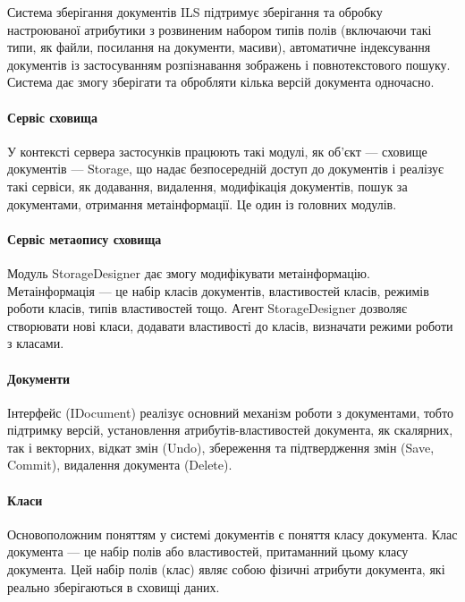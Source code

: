 \documentclass{memoir}
\begin{document}
Система зберігання документів ILS підтримує зберігання та обробку настроюваної атрибутики з розвиненим набором типів полів (включаючи такі типи, як файли, посилання на документи, масиви), автоматичне індексування документів із застосуванням розпізнавання зображень і повнотекстового пошуку. Система дає змогу зберігати та обробляти кілька версій документа одночасно.

\paragraph{Сервіс сховища}

У контексті сервера застосунків працюють такі модулі, як об’єкт — сховище документів — Storage, що надає безпосередній доступ до документів і реалізує такі сервіси, як додавання, видалення, модифікація документів, пошук за документами, отримання метаінформації. Це один із головних модулів.

\paragraph{Сервіс метаопису сховища}

Модуль StorageDesigner дає змогу модифікувати метаінформацію. Метаінформація — це набір класів документів, властивостей класів, режимів роботи класів, типів властивостей тощо. Агент StorageDesigner дозволяє створювати нові класи, додавати властивості до класів, визначати режими роботи з класами.

\paragraph{Документи}

Інтерфейс (IDocument) реалізує основний механізм роботи з документами, тобто підтримку версій, установлення атрибутів-властивостей документа, як скалярних, так і векторних, відкат змін (Undo), збереження та підтвердження змін (Save, Commit), видалення документа (Delete).

\paragraph{Класи}

Основоположним поняттям у системі документів є поняття класу документа. Клас документа — це набір полів або властивостей, притаманний цьому класу документа. Цей набір полів (клас) являє собою фізичні атрибути документа, які реально зберігаються в сховищі даних.
\end{document}
